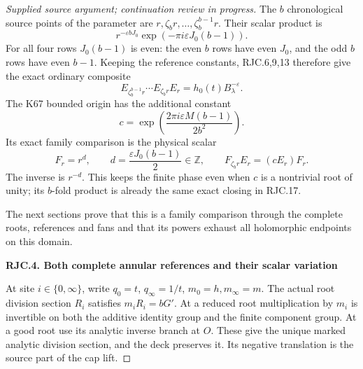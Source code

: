 \begin{proof}[Supplied source argument; continuation review in progress]
The \(b\) chronological source points of the parameter are
\(r,\zeta_b r,\ldots,\zeta_b^{b-1}r\). Their scalar product is
\[
 r^{-\varepsilon bJ_0}
 \exp\!\left(-\pi i\varepsilon J_0(b-1)\right).
\]
For all four rows \(J_0(b-1)\) is even: the even \(b\) rows have even
\(J_0\), and the odd \(b\) rows have even \(b-1\). Keeping the
reference constants, RJC.6,9,13 therefore give the exact ordinary
composite
\[
 E_{\zeta_b^{b-1}r}\cdots E_{\zeta_b r}E_r
       =h_0(t)B_\lambda^{-\varepsilon}.                             \tag{RJC.17}
\]
The K67 bounded origin has the additional constant
\[
 c=\exp\!\left(\frac{2\pi i\varepsilon M(b-1)}{2b^2}\right).
\]
Its exact family comparison is the physical scalar
\[
 F_r=r^d,\qquad d=\frac{\varepsilon J_0(b-1)}2\in\mathbb Z,
 \qquad F_{\zeta_b r}E_r=(cE_r)F_r.                                 \tag{RJC.18}
\]
The inverse is \(r^{-d}\). This keeps the finite phase even when \(c\)
is a nontrivial root of unity; its \(b\)-fold product is already the
same exact closing in RJC.17.

The next sections prove that this is a family comparison through
the complete roots, references and fans and that its powers
exhaust all holomorphic endpoints on this domain.

\par

\medskip\noindent\textbf{RJC.4. Both complete annular references and their scalar variation}

\par\nobreak

At site \(i\in\{0,\infty\}\), write \(q_0=t\),
\(q_\infty=1/t\), \(m_0=h,m_\infty=m\).
The actual root division section \(R_i\) satisfies
\(m_iR_i=bG'\). At a reduced root multiplication by \(m_i\)
is invertible on both the additive identity group and the finite
component group. At a good root use its analytic inverse branch
at \(O\). These give the unique marked analytic division section,
and the deck preserves it. Its negative translation is the
source part of the cap lift.


\end{proof}
